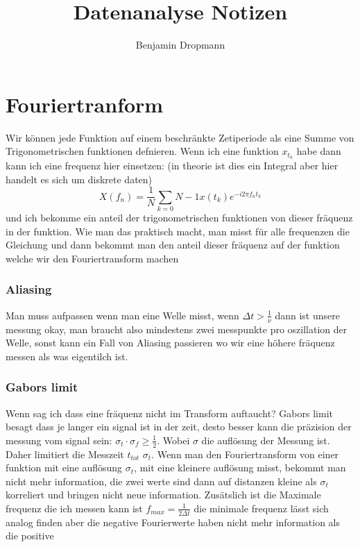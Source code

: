 \documentclass{article}
\title{Datenanalyse Notizen}
\author{Benjamin Dropmann}
\begin{document}
\maketitle
\section{Fouriertranform}
Wir können jede Funktion auf einem beschränkte Zetiperiode als eine Summe von Trigonometrischen funktionen defnieren. Wenn ich eine funktion $x_{t_k}$ habe dann kann ich eine frequenz hier einsetzen: (in theorie ist dies ein Integral aber hier handelt es sich um diskrete daten)
\[X(f_n)=\frac{1}{N}\sum_{k=0}{N-1}x(t_k)e^{-i2\pi f_nt_k}\]
und ich bekomme ein anteil der trigonometrischen funktionen von dieser fräquenz in der funktion.\newline
Wie man das praktisch macht, man misst für alle frequenzen die Gleichung und dann bekommt man den anteil dieser fräquenz auf der funktion welche wir den Fouriertransform machen
\subsubsection{Aliasing} Man muss aufpassen wenn man eine Welle misst, wenn $\Delta t>\frac{1}{\nu}$ dann ist unsere messung okay, man braucht also mindestens zwei messpunkte pro oszillation der Welle, sonst kann ein Fall von Aliasing passieren wo wir eine höhere fräquenz messen als was eigentilch ist.
\subsubsection{Gabors limit} Wenn sag ich dass eine fräquenz nicht im Transform auftaucht? Gabors limit besagt dass je langer ein signal ist in der zeit, desto besser kann die präzision der messung vom signal sein: $\sigma_t\cdot\sigma_f\ge\frac{1}{2}$. Wobei $\sigma$ die auflösung der Messung ist.
Daher limitiert die Messzeit $t_{tot}$ $\sigma_t$. Wenn man den Fouriertransform von einer funktion mit eine auflösung $\sigma_t$, mit eine kleinere auflösung misst, bekommt man nicht mehr information, die zwei werte sind dann auf distanzen kleine als $\sigma_t$ korreliert und bringen nicht neue information.
Zusätslich ist die Maximale frequenz die ich messen kann ist $f_{max}=\frac{1}{2\Delta t}$ die minimale frequenz lässt sich analog finden aber die negative Fourierwerte haben nicht mehr information als die positive
\end{document}
